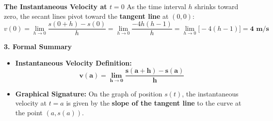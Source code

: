 \documentclass[10.5pt]{article}
\begin{document}
\vspace{0.03in}

\begin{tcolorbox}[colback=boxbg, colframe=boxframe, boxrule=0.8pt, arc=3pt, left=8pt, right=8pt, top=4pt, bottom=4pt]
\textbf{\large The Instantaneous Velocity at $t = 0$}
As the time interval $h$ shrinks toward zero, the secant lines pivot toward the \textbf{tangent line} at $(0,0)$:
\[
  v(0) = \lim_{h\to 0} \frac{s(0+h) - s(0)}{h} = \lim_{h\to 0}\frac{-4h(h-1)}{h} = \lim_{h\to 0}\big[-4(h-1)\big] = \mathbf{4 \text{ m/s}}
\]
\end{tcolorbox}

\vspace{0.04in}

\textbf{\large 3. Formal Summary}

\begin{tcolorbox}[colback=chalkblue!6, colframe=chalkblue, boxrule=1pt, arc=3pt, left=8pt, right=8pt, top=4pt, bottom=4pt]
\begin{itemize}[leftmargin=1.2em, topsep=1pt, itemsep=3pt]
  \item \textbf{Instantaneous Velocity Definition:}
  \[
    \mathbf{v(a) = \lim_{h\to 0} \frac{s(a+h) - s(a)}{h}}
  \]
  \item \textbf{Graphical Signature:} On the graph of position $s(t)$, the instantaneous velocity at $t = a$ is given by the \textbf{slope of the tangent line} to the curve at the point $(a, s(a))$.
\end{itemize}
\end{tcolorbox}
\end{document}
